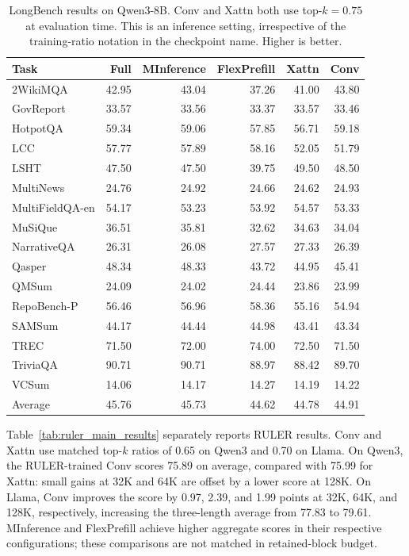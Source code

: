 \begin{table}[t]
    \centering
    \caption{LongBench results on Qwen3-8B. Conv and Xattn both use top-$k=0.75$ at evaluation time. This is an inference setting, irrespective of the training-ratio notation in the checkpoint name. Higher is better.}
    \label{tab:longbench_qwen_topk}
    \small
    \setlength{\tabcolsep}{5pt}
    \begin{tabular}{lrrrrr}
        \toprule
        Task & Full & MInference & FlexPrefill & Xattn & Conv \\
        \midrule
        2WikiMQA & 42.95 & 43.04 & 37.26 & 41.00 & 43.80 \\
        GovReport & 33.57 & 33.56 & 33.37 & 33.57 & 33.46 \\
        HotpotQA & 59.34 & 59.06 & 57.85 & 56.71 & 59.18 \\
        LCC & 57.77 & 57.89 & 58.16 & 52.05 & 51.79 \\
        LSHT & 47.50 & 47.50 & 39.75 & 49.50 & 48.50 \\
        MultiNews & 24.76 & 24.92 & 24.66 & 24.62 & 24.93 \\
        MultiFieldQA-en & 54.17 & 53.23 & 53.92 & 54.57 & 53.33 \\
        MuSiQue & 36.51 & 35.81 & 32.62 & 34.63 & 34.04 \\
        NarrativeQA & 26.31 & 26.08 & 27.57 & 27.33 & 26.39 \\
        Qasper & 48.34 & 48.33 & 43.72 & 44.95 & 45.41 \\
        QMSum & 24.09 & 24.02 & 24.44 & 23.86 & 23.99 \\
        RepoBench-P & 56.46 & 56.96 & 58.36 & 55.16 & 54.94 \\
        SAMSum & 44.17 & 44.44 & 44.98 & 43.41 & 43.34 \\
        TREC & 71.50 & 72.00 & 74.00 & 72.50 & 71.50 \\
        TriviaQA & 90.71 & 90.71 & 88.97 & 88.42 & 89.70 \\
        VCSum & 14.06 & 14.17 & 14.27 & 14.19 & 14.22 \\
        \midrule
        Average & 45.76 & 45.73 & 44.62 & 44.78 & 44.91 \\
        \bottomrule
    \end{tabular}
\end{table}

Table~\ref{tab:ruler_main_results} separately reports RULER results. Conv
and Xattn use matched top-$k$ ratios of 0.65 on Qwen3 and 0.70 on Llama.
On Qwen3, the RULER-trained Conv scores 75.89 on average, compared with
75.99 for Xattn: small gains at 32K and 64K are offset by a lower score
at 128K. On Llama, Conv improves the score by
0.97, 2.39, and 1.99 points at 32K, 64K, and 128K, respectively, increasing
the three-length average from 77.83 to 79.61. MInference and FlexPrefill
achieve higher aggregate scores in their respective configurations; these
comparisons are not matched in retained-block budget.

